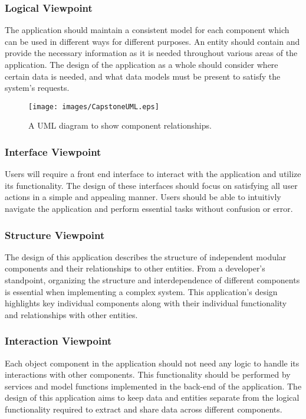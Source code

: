 \documentclass[journal,10pt,onecolumn,compsoc]{IEEEtran}
\begin{document}
    \subsubsection{Logical Viewpoint}  
    The application should maintain a consistent model for each component which can be used in different ways for different purposes. An entity should contain and provide the necessary information as it is needed throughout various areas of the application. The design of the application as a whole should consider where certain data is needed, and what data models must be present to satisfy the system's requests.
    \begin{figure}[H]
        \centering
        \texttt{[image: images/CapstoneUML.eps]}
        \caption{A UML diagram to show component relationships.}
    \end{figure}
    \subsubsection{Interface Viewpoint}  
    Users will require a front end interface to interact with the application and utilize its functionality. The design of these interfaces should focus on satisfying all user actions in a simple and appealing manner. Users should be able to intuitivly navigate the application and perform essential tasks without confusion or error.
    \subsubsection{Structure Viewpoint} 
    The design of this application describes the structure of independent modular components and their relationships to other entities. From a developer's standpoint, organizing the structure and interdependence of different components is essential when implementing a complex system. This application's design highlights key individual components along with their individual functionality and relationships with other entities. 
    \subsubsection{Interaction Viewpoint}  
    Each object component in the application should not need any logic to handle its interactions with other components. This functionality should be performed by services and model functions implemented in the back-end of the application. The design of this application aims to keep data and entities separate from the logical functionality required to extract and share data across different components.
\end{document}
